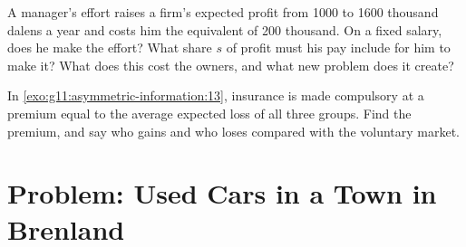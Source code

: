 \begin{exercise}[$\star\star\star$]\label{exo:g11:asymmetric-information:14}
A manager's effort raises a firm's expected profit from 1000 to 1600 thousand dalens a year and costs him the equivalent of 200 thousand. On a fixed salary, does he make
the effort? What share $s$ of profit must his pay include for him to make it? What does this cost the owners, and what new problem does it create?
\end{exercise}

\begin{exercise}[$\star\star\star$]\label{exo:g11:asymmetric-information:15}
In \cref{exo:g11:asymmetric-information:13}, insurance is made compulsory at a premium equal to the average expected loss of all three groups. Find the premium, and say
who gains and who loses compared with the voluntary market.
\end{exercise}

\section{Problem: Used Cars in a Town in Brenland}

